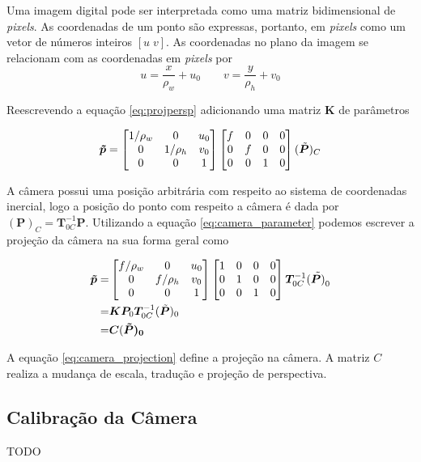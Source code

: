Uma imagem digital pode ser interpretada como uma matriz bidimensional de \textit{pixels}. As coordenadas de um ponto são expressas, portanto, em \textit{pixels} como um vetor de números inteiros $[u\; v]$. As coordenadas no plano da imagem se relacionam com as coordenadas em \textit{pixels} por
\begin{equation}
u =  \frac{x}{\rho_w} + u_0 \qquad v = \frac{y}{\rho_h} + v_0
\end{equation}

Reescrevendo a equação \eqref{eq:projpersp} adicionando uma matriz $\bm{K}$ de parâmetros

\begin{equation} \label{eq:camera_parameter}
\bm{\tilde{p}} = 
\begin{bmatrix}
	1/\rho_w & 0 & u_0 \\
	0        & 1/\rho_h &v_0 \\
	0 & 0 & 1 \\
\end{bmatrix}
\begin{bmatrix} f & 0 & 0 & 0\\
	 0 & f & 0 & 0\\
	 0 & 0 & 1 & 0	
\end{bmatrix}
(\tilde{\bm{P}})_C
\end{equation}

A câmera possui uma posição arbitrária com respeito ao sistema de coordenadas inercial, logo a posição do ponto com respeito a câmera é dada por  $(\bm{P})_C = \bm{T}_{0C}^{-1} \bm{P}$. Utilizando a equação \eqref{eq:camera_parameter} podemos escrever a projeção da câmera na sua forma geral como

\begin{align}\label{eq:camera_projection}
\bm{\tilde{p}} =& 
\begin{bmatrix}
	f/\rho_w & 0 & u_0 \\
	0        & f/\rho_h &v_0 \\
	0 & 0 & 1 \\
\end{bmatrix}
\begin{bmatrix}  1 & 0 & 0 & 0\\
	 0 & 1 & 0 & 0\\
	 0 & 0 & 1 & 0	
\end{bmatrix}
\bm{T}_{0C}^{-1} (\tilde{\bm{P})}_0\\
=& \bm{K} \bm{P}_0 \bm{T}_{0C}^{-1} (\tilde{\bm{P}})_0 \\ 
=& \bm{C} (\bm{\tilde{P})_0}
\end{align}

A equação \eqref{eq:camera_projection} define a projeção na câmera. A matriz $C$ realiza a mudança de escala, tradução e projeção de perspectiva. 

\subsection{Calibração da Câmera}
TODO

